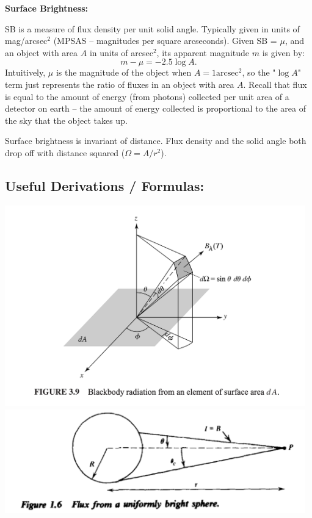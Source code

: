 \documentclass[12pt]{article}
\begin{document}
\textbf{Surface Brightness:}

SB is a measure of flux density per unit solid angle. Typically given in units of mag/arcsec$^2$ (MPSAS -- magnitudes per square arcseconds). Given SB = $\mu$, and an object with area $A$ in units of arcsec$^2$, its apparent magnitude $m$ is given by:
\[m - \mu = -2.5\log{A}.\]
Intuitively, $\mu$ is the magnitude of the object when $A = 1\text{arcsec}^2$, so the "$\log{A}$" term just represents the ratio of fluxes in an object with area $A$. Recall that flux is equal to the amount of energy (from photons) collected per unit area of a detector on earth -- the amount of energy collected is proportional to the area of the sky that the object takes up.

Surface brightness is invariant of distance. Flux density and the solid angle both drop off with distance squared ($\Omega = A/r^2$).

\subsection{Useful Derivations / Formulas:}

\begin{center}
    \includegraphics[width=13cm]{images/intensity.png}
    \includegraphics[width=13cm]{images/fluxdistance.png}
\end{center}
\end{document}
